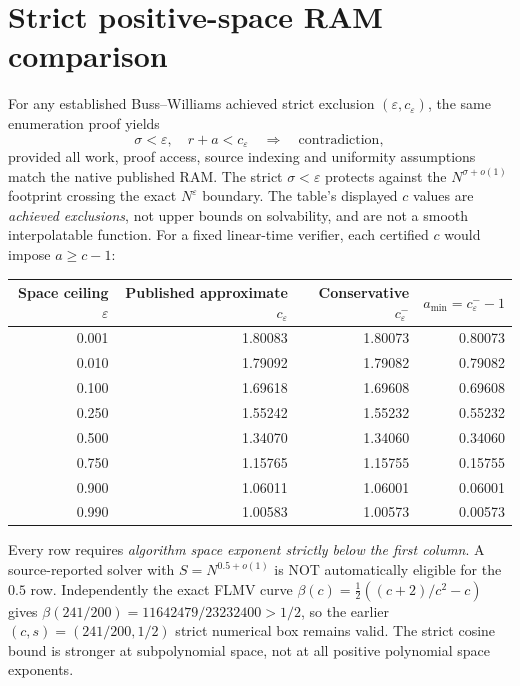 \documentclass[11pt]{article}
\begin{document}
\section{Strict positive-space RAM comparison}
For any established Buss--Williams achieved strict exclusion
$(\varepsilon,c_\varepsilon)$, the same enumeration proof yields
\[
\sigma<\varepsilon,\quad r+a<c_\varepsilon
\quad\Longrightarrow\quad\text{contradiction},\tag{6}
\]
provided all work, proof access, source indexing and
uniformity assumptions match the native published RAM.
The strict $\sigma<\varepsilon$ protects against the
$N^{\sigma+o(1)}$ footprint crossing the exact
$N^\varepsilon$ boundary. The table's displayed $c$ values
are \emph{achieved exclusions}, not upper bounds on solvability,
and are not a smooth interpolatable function. For a fixed linear-time
verifier, each certified $c$ would impose $a\ge c-1$:
\begin{center}\begin{tabular}{rrrr}
\toprule
Space ceiling $\varepsilon$ & Published approximate $c_\varepsilon$ &
Conservative $c^-_\varepsilon$ & $a_{\min}=c^-_\varepsilon-1$\\\midrule
0.001 & 1.80083 & 1.80073 & 0.80073\\
0.010 & 1.79092 & 1.79082 & 0.79082\\
0.100 & 1.69618 & 1.69608 & 0.69608\\
0.250 & 1.55242 & 1.55232 & 0.55232\\
0.500 & 1.34070 & 1.34060 & 0.34060\\
0.750 & 1.15765 & 1.15755 & 0.15755\\
0.900 & 1.06011 & 1.06001 & 0.06001\\
0.990 & 1.00583 & 1.00573 & 0.00573\\
\bottomrule
\end{tabular}\end{center}
Every row requires \emph{algorithm space exponent strictly below the
first column}. A source-reported solver with $S=N^{0.5+o(1)}$ is
NOT automatically eligible for the $0.5$ row. Independently the
exact FLMV curve
$\beta(c)=\frac12((c+2)/c^2-c)$ gives
$\beta(241/200)=11642479/23232400>1/2$,
so the earlier $(c,s)=(241/200,1/2)$
strict numerical box remains valid. The strict cosine bound
is stronger at subpolynomial space, not at all positive
polynomial space exponents.
\end{document}
